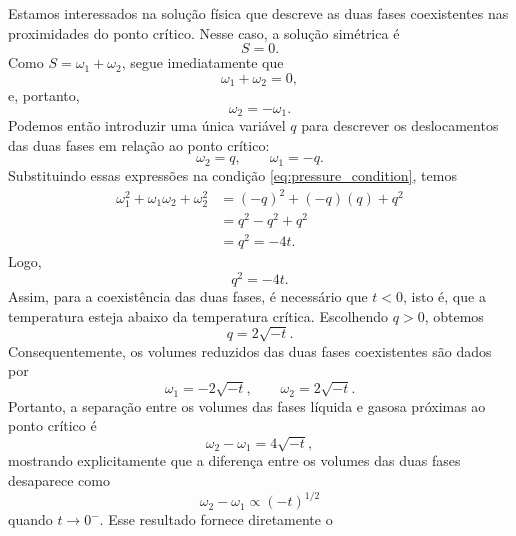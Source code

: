 \documentclass[11pt,a4paper]{article}
\begin{document}
%
Estamos interessados na solução física que descreve as duas fases
coexistentes nas proximidades do ponto crítico. Nesse caso, a solução
simétrica é
%
\begin{equation}
    \boxed{S=0}.
\end{equation}
%
Como $S=\omega_1+\omega_2$, segue imediatamente que
%
\begin{equation}
    \omega_1+\omega_2=0,
\end{equation}
%
e, portanto,
%
\begin{equation}
    \omega_2=-\omega_1.
\end{equation}
%
Podemos então introduzir uma única variável $q$ para descrever os
deslocamentos das duas fases em relação ao ponto crítico:
%
\begin{equation}
    \omega_2=q,
    \qquad
    \omega_1=-q.
\end{equation}
%
Substituindo essas expressões na condição
\eqref{eq:pressure_condition}, temos
%
\begin{align}
    \omega_1^2+\omega_1\omega_2+\omega_2^2
    &=
    (-q)^2+(-q)(q)+q^2
    \nonumber\\
    &=
    q^2-q^2+q^2
    \nonumber\\
    &=
    q^2 = -4t.
\end{align}
%
Logo,
%
\begin{equation}
    q^2=-4t.
\end{equation}
%
Assim, para a coexistência das duas fases, é necessário que
$t<0$, isto é, que a temperatura esteja abaixo da temperatura crítica.
Escolhendo $q>0$, obtemos
%
\begin{equation}
    q=2\sqrt{-t}.
\end{equation}
%
Consequentemente, os volumes reduzidos das duas fases coexistentes
são dados por
%
\begin{equation}
    \boxed{
    \omega_1=-2\sqrt{-t},
    \qquad
    \omega_2=2\sqrt{-t}.
    }
\label{eq:omega_coexistence}
\end{equation}
%
Portanto, a separação entre os volumes das fases líquida e gasosa
próximas ao ponto crítico é
%
\begin{equation}
    \omega_2-\omega_1
    =
    4\sqrt{-t},
\end{equation}
%
mostrando explicitamente que a diferença entre os volumes das duas
fases desaparece como
%
\begin{equation}
    \boxed{
    \omega_2-\omega_1\propto(-t)^{1/2}
    }
\end{equation}
%
quando $t\rightarrow0^{-}$. Esse resultado fornece diretamente o
\end{document}
